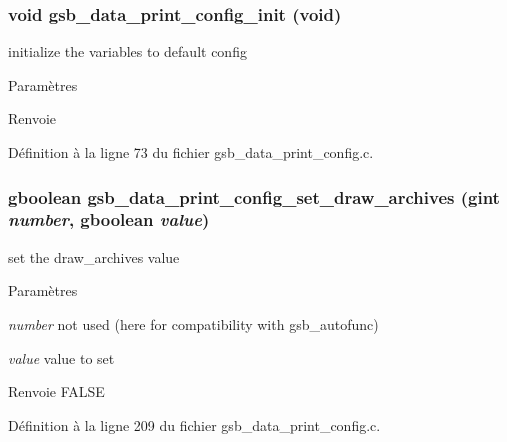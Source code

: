 \subsubsection[{gsb\_\-data\_\-print\_\-config\_\-init}]{\setlength{\rightskip}{0pt plus 5cm}void gsb\_\-data\_\-print\_\-config\_\-init (void)}\label{gsb__data__print__config_8c_ac41ddc7fc1b56a817f79bcab5de201ac}
initialize the variables to default config


\begin{DoxyParams}{Paramètres}
\item[{\em }]\end{DoxyParams}
\begin{DoxyReturn}{Renvoie}

\end{DoxyReturn}


Définition à la ligne 73 du fichier gsb\_\-data\_\-print\_\-config.c.

\subsubsection[{gsb\_\-data\_\-print\_\-config\_\-set\_\-draw\_\-archives}]{\setlength{\rightskip}{0pt plus 5cm}gboolean gsb\_\-data\_\-print\_\-config\_\-set\_\-draw\_\-archives (gint {\em number}, \/  gboolean {\em value})}\label{gsb__data__print__config_8c_a39ab91c1594098a305ee245957ce6e2b}
set the draw\_\-archives value


\begin{DoxyParams}{Paramètres}
\item[{\em number}]not used (here for compatibility with gsb\_\-autofunc) \item[{\em value}]value to set\end{DoxyParams}
\begin{DoxyReturn}{Renvoie}
FALSE 
\end{DoxyReturn}


Définition à la ligne 209 du fichier gsb\_\-data\_\-print\_\-config.c.

